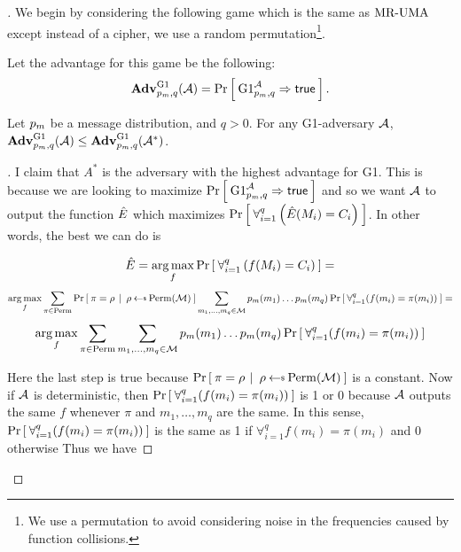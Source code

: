  \begin{proof}[]We begin by considering the following game which is the same as $\textnormal{MR-UMA}$ except instead of a cipher, we use a random permutation\footnote{We use a permutation to avoid considering noise in the frequencies caused by function collisions.}.

\begin{figure}[H]
\centering
{}
\end{figure}

Let the advantage for this game be the following:
$$\mathbf{Adv}^{\textrm{G1}}_{p_m,q}({\mathcal A})=\Pr\left[\: \textrm{G1}^{\mathcal A}_{p_m,q}\Rightarrow\mathsf{true} \:\right].$$

\begin{lemma}
\label{freqsidelem}
Let $p_m$ be a message distribution, and $q>0$. For any G1-adversary ${\mathcal A}$, $\mathbf{Adv}^{\textrm{G1}}_{p_m,q}({\mathcal A})\leq\mathbf{Adv}^{\textrm{G1}}_{p_m,q}({\mathcal A}^*)$.
\end{lemma}

\begin{proof}[]

I claim that $A^*$ is the adversary with the highest advantage for G1.  This is because we are looking to maximize 
$\Pr\left[\: \textrm{G1}^{\mathcal A}_{p_m,q}\Rightarrow\mathsf{true} \:\right]$
and so we want ${\mathcal A}$ to output the function $\hat{E}$ which maximizes $\Pr\left[\: \forall_{i=1}^q \left(\hat{E}(M_i) = C_i\right) \:\right]$. In other words, the best we can do is 

$$\hat{E}=\operatorname*{arg\,max}_f \Pr\left[\: \forall_{i=1}^q \left(f(M_i) = C_i\right) \:\right]=$$
$$\argmax_f \sum_{\pi\in\Perm}\CondProb{\pi=\rho}{\rho\getsr\Perm(\msgspace)} \sum_{m_1, \ldots,m_q\in \msgspace} \mdist(m_1)\ldots\mdist(m_q)\Prob{\forall_{i=1}^q (f(m_i)=\pi(m_i))}=$$
$$\operatorname*{arg\,max}_f \sum_{\pi\in\mathrm{Perm}}\sum_{m_1, \ldots,m_q\in {\cal M}} p_m(m_1)\ldots p_m(m_q)\Pr\left[\: \forall_{i=1}^q (f(m_i)=\pi(m_i)) \:\right]$$

Here the last step is true because $\CondProb{\pi=\rho}{\rho\getsr\Perm(\msgspace)} $ is a constant. Now if ${\mathcal A}$ is deterministic, then $\Pr\left[\: \forall_{i=1}^q (f(m_i)=\pi(m_i)) \:\right]$ is 1 or 0 because ${\mathcal A}$ outputs the same $f$ whenever $\pi$ and $m_1,\ldots,m_q$ are the same. In this sense, $\Pr\left[\: \forall_{i=1}^q (f(m_i)=\pi(m_i)) \:\right]$ is the same as 1 if $\forall_{i=1}^q f(m_i)=\pi(m_i)$ and 0 otherwise  Thus we have


\end{proof}
\end{proof}
